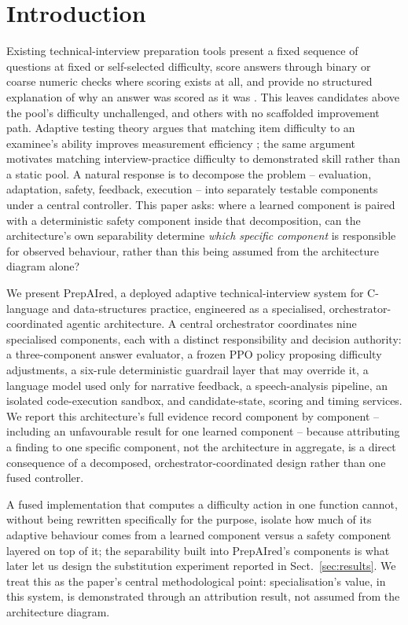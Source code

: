 \documentclass[runningheads]{llncs}
\begin{document}
\section{Introduction}

Existing technical-interview preparation tools present a fixed sequence of questions at fixed or self-selected difficulty, score answers through binary or coarse numeric checks where scoring exists at all, and provide no structured explanation of why an answer was scored as it was \cite{key9}. This leaves candidates above the pool's difficulty unchallenged, and others with no scaffolded improvement path. Adaptive testing theory argues that matching item difficulty to an examinee's ability improves measurement efficiency \cite{key9}; the same argument motivates matching interview-practice difficulty to demonstrated skill rather than a static pool. A natural response is to decompose the problem -- evaluation, adaptation, safety, feedback, execution -- into separately testable components under a central controller. This paper asks: where a learned component is paired with a deterministic safety component inside that decomposition, can the architecture's own separability determine \emph{which specific component} is responsible for observed behaviour, rather than this being assumed from the architecture diagram alone?

We present PrepAIred, a deployed adaptive technical-interview system for C-language and data-structures practice, engineered as a specialised, orchestrator-coordinated agentic architecture. A central orchestrator coordinates nine specialised components, each with a distinct responsibility and decision authority: a three-component answer evaluator, a frozen PPO \cite{key6} policy proposing difficulty adjustments, a six-rule deterministic guardrail layer that may override it, a language model used only for narrative feedback, a speech-analysis pipeline, an isolated code-execution sandbox, and candidate-state, scoring and timing services. We report this architecture's full evidence record component by component -- including an unfavourable result for one learned component -- because attributing a finding to one specific component, not the architecture in aggregate, is a direct consequence of a decomposed, orchestrator-coordinated design rather than one fused controller.

A fused implementation that computes a difficulty action in one function cannot, without being rewritten specifically for the purpose, isolate how much of its adaptive behaviour comes from a learned component versus a safety component layered on top of it; the separability built into PrepAIred's components is what later let us design the substitution experiment reported in Sect.~\ref{sec:results}. We treat this as the paper's central methodological point: specialisation's value, in this system, is demonstrated through an attribution result, not assumed from the architecture diagram.
\end{document}
